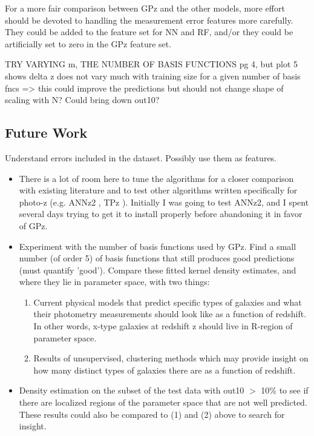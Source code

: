 \documentclass[13pt]{amsart}
\begin{document}
  For a more fair comparison between GPz and the other models, more effort should be devoted to handling the measurement error features more carefully. They could be added to the feature set for NN and RF, and/or they could be artificially set to zero in the GPz feature set.


        TRY VARYING m, THE NUMBER OF BASIS FUNCTIONS \cite{sgp} pg 4, but plot 5 shows delta z does not vary much with training size for a given number of basis fncs => this could improve the predictions but should not change shape of scaling with N? Could bring down out10?



  \subsection{Future Work}

    Understand errors included in the dataset. Possibly use them as features.

    \begin{itemize}
      \item There is a lot of room here to tune the algorithms for a closer comparison with existing literature and to test other algorithms written specifically for photo-z (e.g. ANNz2 \cite{annz2}, TPz \cite{tpz}). Initially I was going to test ANNz2, and I spent several days trying to get it to install properly before abandoning it in favor of GPz.


      \item Experiment with the number of basis functions used by GPz. Find a small number (of order 5) of basis functions that still produces good predictions (must quantify 'good'). Compare these fitted kernel density estimates, and where they lie in parameter space, with two things:
        \begin{enumerate}

          \item Current physical models that predict specific types of galaxies and what their photometry measurements should look like as a function of redshift. In other words, x-type galaxies at redshift z should live in R-region of parameter space.

          \item Results of unsupervised, clustering methods which may provide insight on how many distinct types of galaxies there are as a function of redshift.
        \end{enumerate}

      \item Density estimation on the subset of the test data with out10 $>$ 10\% to see if there are localized regions of the parameter space that are not well predicted. These results could also be compared to (1) and (2) above to search for insight.

    \end{itemize}




\end{document}
